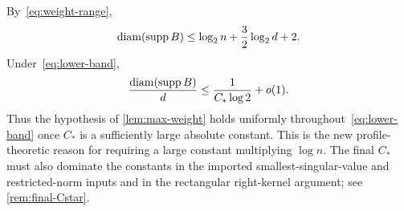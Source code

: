 \begin{remark}\label{rem:large-log-constant}
By~\eqref{eq:weight-range},
\[
  \operatorname{diam}(\operatorname{supp} B)\le\log_2n+\frac32\log_2d+2.
\]
Under~\eqref{eq:lower-band},
\[
  \frac{\operatorname{diam}(\operatorname{supp} B)}d
  \le\frac1{C_*\log2}+o(1).
\]
Thus the hypothesis of \cref{lem:max-weight} holds uniformly throughout~\eqref{eq:lower-band} once $C_*$ is a sufficiently large absolute constant. This is the new profile-theoretic reason for requiring a large constant multiplying $\log n$. The final $C_*$ must also dominate the constants in the imported smallest-singular-value and restricted-norm inputs and in the rectangular right-kernel argument; see \cref{rem:final-Cstar}.
\end{remark}
